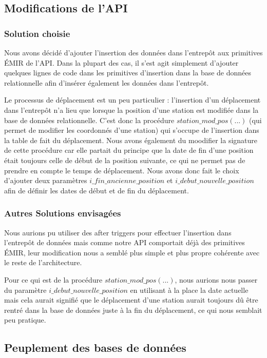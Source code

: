 \documentclass{article}
\begin{document}
\subsection{Modifications de l'API}
\subsubsection*{Solution choisie}
Nous avons décidé d'ajouter l'insertion des données dans l'entrepôt aux primitives
ÉMIR de l'API. Dans la plupart des cas, il s'est agit simplement d'ajouter quelques
lignes de code dans les primitives d'insertion dans la base de données relationnelle
afin d'insérer également les données dans l'entrepôt.

Le processus de déplacement est un peu particulier : l'insertion d'un déplacement
dans l'entrepôt n'a lieu que lorsque la position d'une station est modifiée dans
la base de données relationnelle. C'est donc la procédure 
$station\_mod\_pos(...)$ (qui permet de modifier les coordonnés d'une station) qui 
s'occupe de l'insertion dans la table de fait du déplacement. Nous avons également
du moodifier la signature de cette procédure car elle partait du principe que la date
de fin d'une position était toujours celle de début de la position suivante, ce qui
ne permet pas de prendre en compte le temps de déplacement. Nous avons donc fait le
choix d'ajouter deux paramètres $i\_fin\_ancienne\_position$ et $i\_debut\_nouvelle\_position$
afin de définir les dates de début et de fin du déplacement.

\subsubsection*{Autres Solutions envisagées}
Nous aurions pu utiliser des after triggers pour effectuer l'insertion dans l'entrepôt
de données mais comme notre API comportait déjà des primitives ÉMIR, leur modification
nous a semblé plus simple et plus propre cohérente avec le reste de l'architecture.

Pour ce qui est de la procédure $station\_mod\_pos(...)$, nous aurions nous passer
du paramètre $i\_debut\_nouvelle\_position$ en utilisant à la place la date actuelle
mais cela aurait signifié que le déplacement d'une station aurait toujours dû être
rentré dans la base de données juste à la fin du déplacement, ce qui nous semblait
peu pratique.

\subsection{Peuplement des bases de données}
\end{document}
